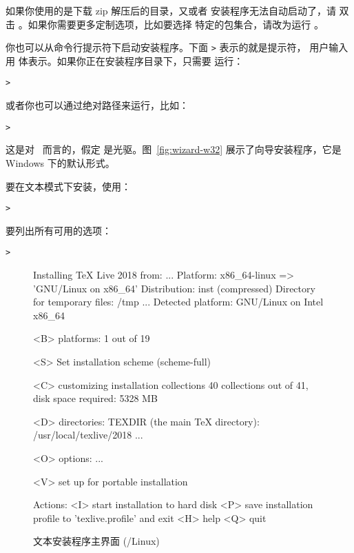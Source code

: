 \documentclass{article}
\begin{document}
如果你使用的是下载 zip 解压后的目录，又或者 \DVD 安装程序无法自动启动了，请
双击 。如果你需要更多定制选项，比如要选择
特定的包集合，请改为运行 。

你也可以从命令行提示符下启动安装程序。下面 \texttt{>} 表示的就是提示符，
用户输入用  体表示。如果你正在安装程序目录下，只需要
运行：
\begin{alltt}
> 
\end{alltt}

或者你也可以通过绝对路径来运行，比如：
\begin{alltt}
> 
\end{alltt}
这是对 \TK\ \DVD 而言的，假定  是光驱。图~\ref{fig:wizard-w32}
展示了向导安装程序，它是 Windows 下的默认形式。

要在文本模式下安装，使用：
\begin{alltt}
> 
\end{alltt}

要列出所有可用的选项：
\begin{alltt}
> 
\end{alltt}

\begin{figure}[tb]
\begin{boxedverbatim}
Installing TeX Live 2018 from: ...
Platform: x86_64-linux => 'GNU/Linux on x86_64'
Distribution: inst (compressed)
Directory for temporary files: /tmp
...
 Detected platform: GNU/Linux on Intel x86_64

 <B> platforms: 1 out of 19

 <S> Set installation scheme (scheme-full)

 <C> customizing installation collections
     40 collections out of 41, disk space required: 5328 MB

 <D> directories:
   TEXDIR (the main TeX directory):
     /usr/local/texlive/2018
   ...

 <O> options:
   ...

 <V> set up for portable installation

Actions:
 <I> start installation to hard disk
 <P> save installation profile to 'texlive.profile' and exit
 <H> help
 <Q> quit
\end{boxedverbatim}
\caption{文本安装程序主界面 (\GNU/Linux)}\label{fig:text-main}
\end{figure}
\end{document}
